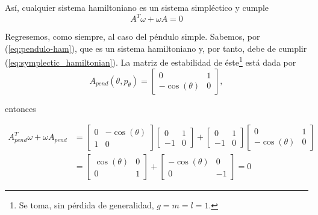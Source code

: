 Así, cualquier sistema hamiltoniano es un sistema simpléctico y cumple
\begin{equation}
 A^T\omega + \omega A = 0
 \label{eq:symplectic_hamiltonian}
\end{equation}


Regresemos, como siempre, al caso del péndulo simple. Sabemos, por (\ref{eq:pendulo-ham}), que es un sistema hamiltoniano y, por tanto, debe de cumplir (\ref{eq:symplectic_hamiltonian}). La matriz de estabilidad de éste\footnote{Se toma, sin pérdida de generalidad, $g = m = l = 1$.} está dada por
\begin{equation*}
  A_{pend}(\theta,p_\theta) =
  \begin{bmatrix}
    0             & 1 \\
    -\cos(\theta) & 0
  \end{bmatrix},
\end{equation*}

entonces

\begin{align*}
  A_{pend}^T \omega + \omega A_{pend} &=
  \begin{bmatrix}
    0 & -\cos(\theta) \\
    1 & 0
  \end{bmatrix}   
  \begin{bmatrix}
    0  & 1 \\
    -1 & 0
  \end{bmatrix} 
  +
  \begin{bmatrix}
    0  & 1 \\
    -1 & 0
  \end{bmatrix} 
  \begin{bmatrix}
    0             & 1 \\
    -\cos(\theta) & 0
  \end{bmatrix} \\
  &=
  \begin{bmatrix}
    \cos(\theta)  & 0 \\
    0             & 1
  \end{bmatrix}
  +
  \begin{bmatrix}
    -\cos(\theta)  & 0 \\
    0              & -1
  \end{bmatrix}
  = 0 
\end{align*}

